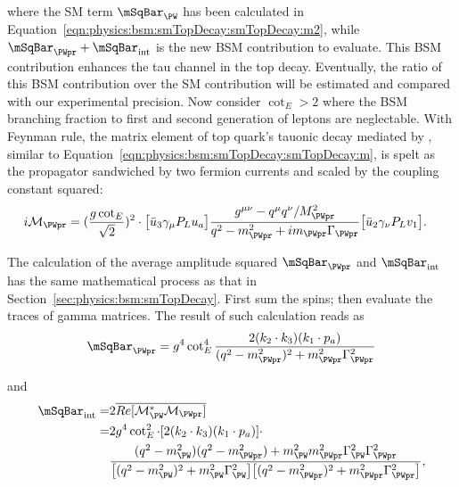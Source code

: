 \noindent where the SM term $\mSqBar _{\PW} $  has been calculated in Equation~\ref{eqn:physics:bsm:smTopDecay:smTopDecay:m2}, while $\mSqBar _{\PWpr} +  \mSqBar _{\mathrm{int}}$ is the new BSM contribution to evaluate. This BSM contribution enhances the tau channel in the top decay. Eventually, the ratio of this BSM contribution over the SM contribution will be estimated and compared with our experimental precision. Now consider $\cot_E > 2$ where the BSM branching fraction to first and second generation of leptons are neglectable. With Feynman rule, the matrix element of top quark's tauonic decay mediated by \PWpr, similar to Equation~\ref{eqn:physics:bsm:smTopDecay:smTopDecay:m}, is spelt as the \PWpr propagator sandwiched by two fermion currents and scaled by the coupling constant squared:
\begin{equation}
\begin{split}
	i \mathcal{M}_{\PWpr}  & =  (\frac{g \cot_E}{\sqrt{2}})^2 \cdot 
	\big[ \bar{u}_3 \gamma_\mu P_L u_a \big] 
	\frac{g^{\mu \nu} - q^\mu q^\nu/M^2_{\PWpr}}{q^2-m^2_{\PWpr} + i m_{\PWpr} \Gamma_{\PWpr}} 
	\big[ \bar{u}_2 \gamma_\nu P_L v_1 \big] .
\end{split}
\end{equation}

\noindent The calculation of the average amplitude squared  $\mSqBar _{\PWpr} $ and $\mSqBar _{\mathrm{int}}$ has the same mathematical process as that in Section~\ref{sec:physics:bsm:smTopDecay}. First sum the spins; then evaluate the traces of gamma matrices. The result of such calculation reads as
\begin{equation}
	\mSqBar_{\PWpr} =  g^4 \cot_E^4 \frac{2  (  k_2 \cdot k_3) (  k_1 \cdot p_a) }{ (  q^2-m^2_{\PWpr})^2 +  m^2_{\PWpr} \Gamma^2_{\PWpr} }  
\end{equation}

\noindent and
\begin{equation}
\begin{split}
    \mSqBar _{\mathrm{int}} = &   2 \overline{ Re[\mathcal{M}^*_{\PW} \mathcal{M}_{\PWpr}] }  \\
    =& 2 g ^4\cot^2_E  \cdot  [2  (  k_2 \cdot k_3) (  k_1 \cdot p_a) ] \cdot \\
    &\frac 
    {( q^2-m^2_{\PW}) ( q^2-m^2_{\PWpr}) + m^2_{\PW}  m^2_{\PWpr}  \Gamma^2_{\PW} \Gamma^2_{\PWpr} }
    { \big[ ( q^2-m^2_{\PW})^2 +  m^2_{\PW} \Gamma^2_{\PW} \big] \big[ (  q^2-m^2_{\PWpr})^2 +  m^2_{\PWpr} \Gamma^2_{\PWpr} \big] }   
    ,
\end{split}
\end{equation}

